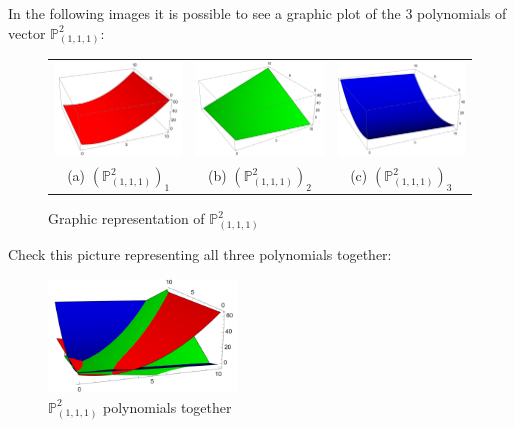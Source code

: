 \documentclass[12pt,a4]{article}
\theoremstyle{plain}
\begin{document}
In the following images it is possible to see a graphic plot of the 3 polynomials of vector $\mathbb P_{(1,1,1)}^2$:
\begin{figure}[h]
    \centering\begin{tabular}{ccc}
      \includegraphics[width=4.5cm]{./img/laguerre1.png} & 
      \includegraphics[width=4.5cm]{./img/laguerre2.png} &
      \includegraphics[width=4.5cm]{./img/laguerre3.png} \\
      (a) $(\mathbb P_{(1,1,1)}^2)_1$ & (b) $(\mathbb P_{(1,1,1)}^2)_2$ & (c) $(\mathbb P_{(1,1,1)}^2)_3$  \\
    \end{tabular}
    \caption{Graphic representation of $\mathbb P_{(1,1,1)}^2$}
    \label{fig:example}
  \end{figure}

  Check this picture representing all three polynomials together:

  \begin{figure}[h]
    \centering\includegraphics[width=5cm]{./img/EjemploLaguerre.png}
    \caption{$\mathbb P_{(1,1,1)}^2$ polynomials together}
    \label{fig:example-2}
  \end{figure}
\end{document}
